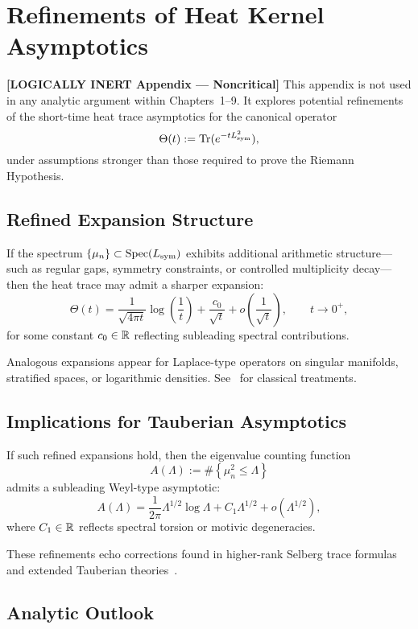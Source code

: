 \section{Refinements of Heat Kernel Asymptotics}
\label{app:heat_kernel_refinements}

\noindent\textbf{[LOGICALLY INERT Appendix — Noncritical]}  
This appendix is not used in any analytic argument within Chapters~1–9. It explores potential refinements of the short-time heat trace asymptotics for the canonical operator
\[
\Theta(t) := \operatorname{Tr}(e^{-t L_{\mathrm{sym}}^2}),
\]
under assumptions stronger than those required to prove the Riemann Hypothesis.

\subsection*{Refined Expansion Structure}

If the spectrum \( \{ \mu_n \} \subset \operatorname{Spec}(L_{\mathrm{sym}}) \) exhibits additional arithmetic structure—such as regular gaps, symmetry constraints, or controlled multiplicity decay—then the heat trace may admit a sharper expansion:
\[
\Theta(t) = \frac{1}{\sqrt{4\pi t}} \log\left( \frac{1}{t} \right)
+ \frac{c_0}{\sqrt{t}} + o\left( \frac{1}{\sqrt{t}} \right),
\qquad t \to 0^+,
\]
for some constant \( c_0 \in \mathbb{R} \) reflecting subleading spectral contributions.

Analogous expansions appear for Laplace-type operators on singular manifolds, stratified spaces, or logarithmic densities. See~\cite{Seeley1967ComplexPowers, Gilkey1995Invariance, Vaillant2001HeatKernel} for classical treatments.

\subsection*{Implications for Tauberian Asymptotics}

If such refined expansions hold, then the eigenvalue counting function
\[
A(\Lambda) := \#\left\{ \mu_n^2 \le \Lambda \right\}
\]
admits a subleading Weyl-type asymptotic:
\[
A(\Lambda) = \frac{1}{2\pi} \Lambda^{1/2} \log \Lambda + C_1 \Lambda^{1/2} + o(\Lambda^{1/2}),
\]
where \( C_1 \in \mathbb{R} \) reflects spectral torsion or motivic degeneracies.

These refinements echo corrections found in higher-rank Selberg trace formulas and extended Tauberian theories~\cite{Korevaar2004Tauberian}.

\subsection*{Analytic Outlook}

